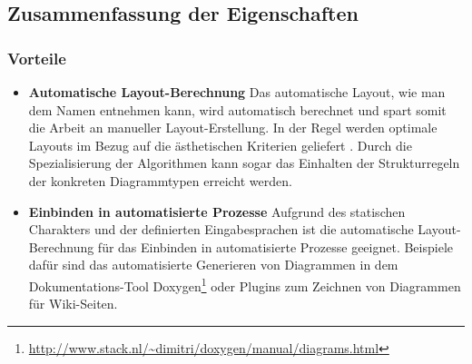 





\subsection{Zusammenfassung der Eigenschaften}

\subsubsection{Vorteile}

\begin{itemize}
    \item \textbf{Automatische Layout-Berechnung} Das automatische Layout, wie man dem Namen entnehmen kann, wird automatisch berechnet und spart somit die Arbeit an manueller Layout-Erstellung. In der Regel werden optimale Layouts im Bezug auf die ästhetischen Kriterien geliefert \cite{Maier12A-Pattern-based}. Durch die Spezialisierung der Algorithmen kann sogar das Einhalten der Strukturregeln der konkreten Diagrammtypen erreicht werden.
    \item \textbf{Einbinden in automatisierte Prozesse} Aufgrund des statischen Charakters und der definierten Eingabesprachen ist die automatische Layout-Berechnung für das Einbinden in automatisierte Prozesse geeignet. Beispiele dafür sind das automatisierte Generieren von Diagrammen in dem Dokumentations-Tool Doxygen\footnote{\url{http://www.stack.nl/~dimitri/doxygen/manual/diagrams.html}} oder Plugins zum Zeichnen von Diagrammen für Wiki-Seiten.
\end{itemize}

